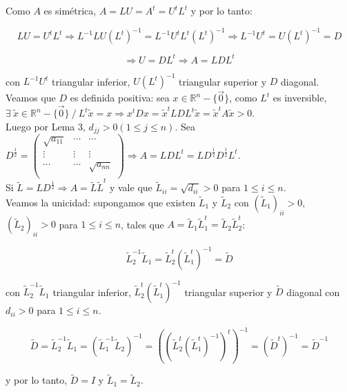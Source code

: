 Como $A$ es sim\'etrica, $A = LU = A^{t} = U^{t}L^{t}$ y por lo tanto:

$$LU = U^{t}L^{t} \Rightarrow L^{-1}LU(L^{t})^{-1} = L^{-1}U^{t}L^{t}(L^{t})^{-1} \Rightarrow L^{-1}U^{t} = U(L^{t})^{-1} = D$$

$$\Rightarrow U = DL^{t} \Rightarrow A = LDL^{t}$$

con $L^{-1}U^{t}$ triangular inferior, $U(L^{t})^{-1}$ triangular superior y $D$ diagonal.\\

Veamos que $D$ es definida positiva: sea $x \in \mathbb{R}^{n} - \{\Vec{0}\}$, como $L^{t}$ es inversible, $\exists\ \tilde{x} \in \mathbb{R}^{n} - \{\Vec{0}\}\ / \ L^{t}\tilde{x} = x \Rightarrow x^{t}Dx = \tilde{x}^{t}LDL^{t}\tilde{x} = \tilde{x}^{t}A\tilde{x} > 0$.\\

Luego por Lema 3, $d_{jj} > 0 (1 \leq j \leq n)$. Sea $ D^{\frac{1}{2}} =
	\begin{pmatrix}
        \sqrt{a_{11}} & \cdots & \cdots\\
        \vdots & \vdots & \vdots\\
        \cdots & \cdots & \sqrt{a_{nn}}\\
	\end{pmatrix}
\Rightarrow A = LDL^{t} = LD^{\frac{1}{2}}D^{\frac{1}{2}}L^{t}$.\\

Si $\tilde{L} = LD^{\frac{1}{2}} \Rightarrow A = \tilde{L}\tilde{L}^{t}$ y vale que $\tilde{L}_{ii} = \sqrt{d_{ii}} > 0$ para $1 \leq i \leq n$.\\

Veamos la unicidad: supongamos que existen $\tilde{L}_{1}$ y $\tilde{L}_{2}$ con $(\tilde{L}_{1})_{ii} > 0$, $(\tilde{L}_{2})_{ii} > 0$ para $1 \leq i \leq n$, tales que $A = \tilde{L}_{1}\tilde{L}_{1}^{t} = \tilde{L}_{2}\tilde{L}_{2}^{t}$:

$$\tilde{L}_{2}^{-1}\tilde{L}_{1} = \tilde{L}_{2}^{t}(\tilde{L}_{1}^{t})^{-1} = \tilde{D}$$

con $\tilde{L}_{2}^{-1}\tilde{L}_{1}$ triangular inferior, $\tilde{L}_{2}^{t}(\tilde{L}_{1}^{t})^{-1}$ triangular superior y $\tilde{D}$ diagonal con $d_{ii} > 0$ para $1 \leq i \leq n$.

$$\tilde{D} = \tilde{L}_{2}^{-1}\tilde{L}_{1} = (\tilde{L}_{1}^{-1}\tilde{L}_{2})^{-1} = ((\tilde{L}_{2}^{t}(\tilde{L}_{1}^{t})^{-1})^{t})^{-1} = (\tilde{D}^{t})^{-1} = \tilde{D}^{-1}$$

y por lo tanto, $\tilde{D} = I$ y $\tilde{L}_{1} = \tilde{L}_{2}$.\\

